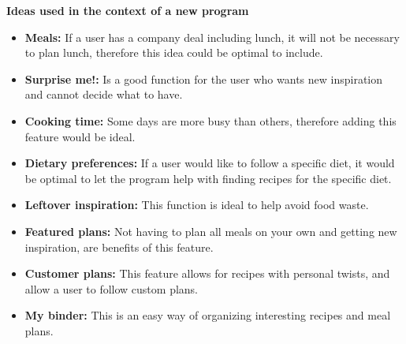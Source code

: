 \textbf{Ideas used in the context of a new program}
\begin{itemize}
  \item \textbf{Meals:} If a user has a company deal including lunch, it will not be necessary to plan lunch, therefore this idea could be optimal to include.
  \item \textbf{Surprise me!:} Is a good function for the user who wants new inspiration and cannot decide what to have.
  \item \textbf{Cooking time:} Some days are more busy than others, therefore adding this feature would be ideal.
  \item \textbf{Dietary preferences:} If a user would like to follow a specific diet, it would be optimal to let the program help with finding recipes for the specific diet.
  \item \textbf{Leftover inspiration:} This function is ideal to help avoid food waste.
  \item \textbf{Featured plans:} Not having to plan all meals on your own and getting new inspiration, are benefits of this feature.
  \item \textbf{Customer plans:} This feature allows for recipes with personal twists, and allow a user to follow custom plans.
  \item \textbf{My binder:} This is an easy way of organizing interesting recipes and meal plans. 
\end{itemize}